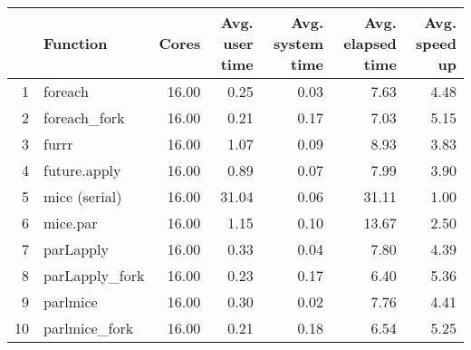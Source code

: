 \begin{table}[ht]
\centering
\begin{tabular}{rlrrrrr}
  \hline
 & Function & Cores & Avg. user time & Avg. system time & Avg. elapsed time & Avg. speed up \\ 
  \hline
1 & foreach & 16.00 & 0.25 & 0.03 & 7.63 & 4.48 \\ 
  2 & foreach\_fork & 16.00 & 0.21 & 0.17 & 7.03 & 5.15 \\ 
  3 & furrr & 16.00 & 1.07 & 0.09 & 8.93 & 3.83 \\ 
  4 & future.apply & 16.00 & 0.89 & 0.07 & 7.99 & 3.90 \\ 
  5 & mice (serial) & 16.00 & 31.04 & 0.06 & 31.11 & 1.00 \\ 
  6 & mice.par & 16.00 & 1.15 & 0.10 & 13.67 & 2.50 \\ 
  7 & parLapply & 16.00 & 0.33 & 0.04 & 7.80 & 4.39 \\ 
  8 & parLapply\_fork & 16.00 & 0.23 & 0.17 & 6.40 & 5.36 \\ 
  9 & parlmice & 16.00 & 0.30 & 0.02 & 7.76 & 4.41 \\ 
  10 & parlmice\_fork & 16.00 & 0.21 & 0.18 & 6.54 & 5.25 \\ 
   \hline
\end{tabular}
\end{table}
